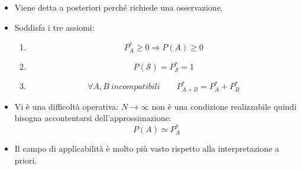 \documentclass[11pt,a4paper]{book}
\begin{document}
\begin{itemize}
\item Viene detta a posteriori perché richiede una osservazione.
\item Soddisfa i tre assiomi:
\begin{enumerate}
\item 
\begin{equation}
P^*_A \geq 0 \Rightarrow P(A) \geq 0
\end{equation}
\item 
\begin{equation}
P(\mathcal{S}) = P_\mathcal{S}^* = 1
\end{equation}
\item 
\begin{equation}
\forall A, B \ \textit{incompatibili} \qquad P^*_{A+B} =P^*_A+P^*_B
\end{equation}
\end{enumerate}
\item Vi è una difficoltà operativa: $ N \to \infty $ non è una condizione realizzabile quindi bisogna accontentarsi dell'approssimazione:
\begin{equation}
P(A) \simeq P^*_A
\end{equation}
\item Il campo di applicabilità è molto più vasto rispetto alla interpretazione a priori.
\end{itemize}
\end{document}
